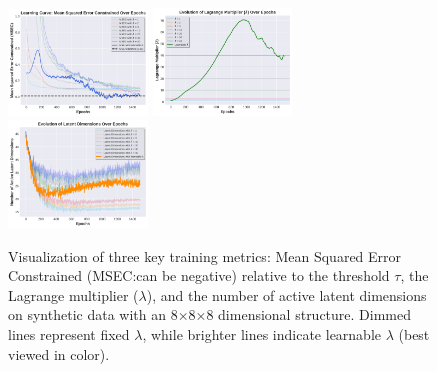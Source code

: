 \documentclass[doubleblind]{ecai}
\begin{document}
\begin{table} [!ht]
\begin{tabular}{lrrrrrrr}
			\bottomrule
		\end{tabular}
		
		\label{tab:synthetic}
	\end{table}
	
	\begin{figure}[!ht]
		\centering
		
		\includegraphics[width=0.33\textwidth]{Images/MSE_wo_GECO.png}
		\includegraphics[width=0.33\textwidth]{Images/langragian_multiplier_wo_GECO.png}
		\includegraphics[width=0.33\textwidth]{Images/latent_dims_wo_GECO.png}
		
		\caption{Visualization of three key training metrics: Mean Squared Error Constrained (MSEC:can be negative) relative to the threshold $\tau$, the Lagrange multiplier ($\lambda$), and the number of active latent dimensions on synthetic data with an 8×8×8 dimensional structure. Dimmed lines represent fixed $\lambda$, while brighter lines indicate learnable $\lambda$ (best viewed in color).}
		
		\label{fig:learning_curves}
	\end{figure}
	
	
\end{document}
